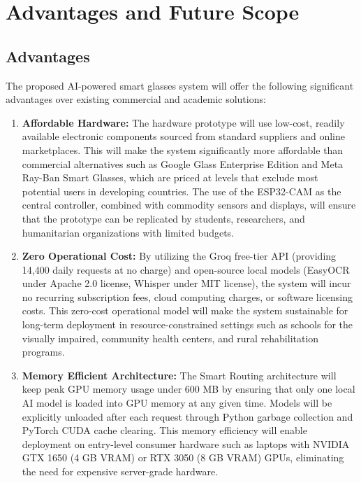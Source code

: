 \chapter{Advantages and Future Scope}

\section{Advantages}
The proposed AI-powered smart glasses system will offer the following significant advantages over existing commercial and academic solutions:

\begin{enumerate}[leftmargin=1.5cm]
\item \textbf{Affordable Hardware:} The hardware prototype will use low-cost, readily available electronic components sourced from standard suppliers and online marketplaces. This will make the system significantly more affordable than commercial alternatives such as Google Glass Enterprise Edition and Meta Ray-Ban Smart Glasses, which are priced at levels that exclude most potential users in developing countries. The use of the ESP32-CAM as the central controller, combined with commodity sensors and displays, will ensure that the prototype can be replicated by students, researchers, and humanitarian organizations with limited budgets.

\item \textbf{Zero Operational Cost:} By utilizing the Groq free-tier API (providing 14,400 daily requests at no charge) and open-source local models (EasyOCR under Apache 2.0 license, Whisper under MIT license), the system will incur no recurring subscription fees, cloud computing charges, or software licensing costs. This zero-cost operational model will make the system sustainable for long-term deployment in resource-constrained settings such as schools for the visually impaired, community health centers, and rural rehabilitation programs.

\item \textbf{Memory Efficient Architecture:} The Smart Routing architecture will keep peak GPU memory usage under 600 MB by ensuring that only one local AI model is loaded into GPU memory at any given time. Models will be explicitly unloaded after each request through Python garbage collection and PyTorch CUDA cache clearing. This memory efficiency will enable deployment on entry-level consumer hardware such as laptops with NVIDIA GTX 1650 (4 GB VRAM) or RTX 3050 (8 GB VRAM) GPUs, eliminating the need for expensive server-grade hardware.


\end{enumerate}
